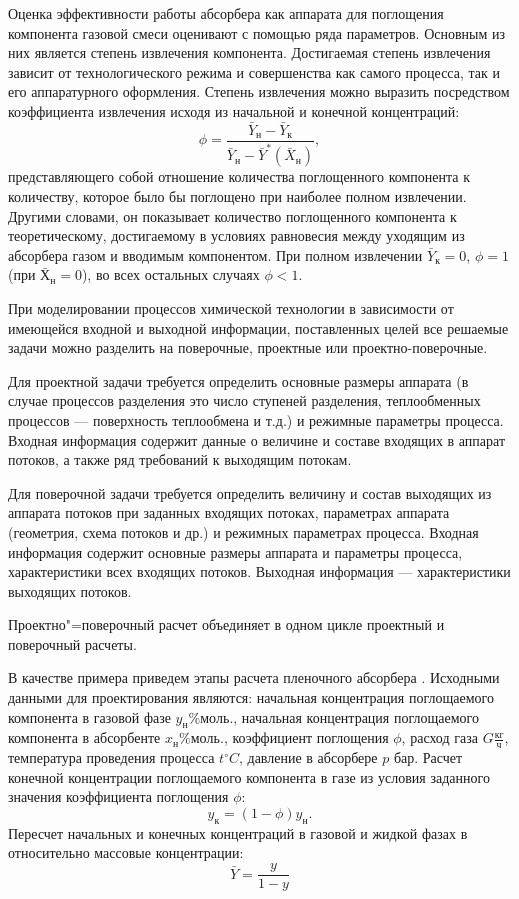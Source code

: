 Оценка эффективности работы абсорбера как аппарата для поглощения компонента газовой смеси оценивают с помощью ряда параметров. Основным из них является степень извлечения компонента. Достигаемая степень извлечения зависит от технологического режима и совершенства как самого процесса, так и его аппаратурного оформления. Степень извлечения можно выразить посредством коэффициента извлечения исходя из начальной и конечной концентраций:
\begin{equation}
	\phi =\dfrac{\bar{Y}_н - \bar{Y}_к}{\bar{Y}_н - \bar{Y}^*(\bar{X}_н)},
\end{equation}
представляющего собой отношение количества поглощенного компонента к количеству, которое было бы поглощено при наиболее полном извлечении. Другими словами, он показывает количество поглощенного компонента к теоретическому, достигаемому в условиях равновесия между уходящим из абсорбера газом и вводимым компонентом. При полном извлечении $\bar{Y}_к=0$, $\phi=1$ (при $\bar{Х}_н=0$), во всех остальных случаях $\phi<1$.
 
При моделировании процессов химической технологии в зависимости от имеющейся входной и выходной информации, поставленных целей все решаемые задачи можно разделить на поверочные, проектные или проектно-поверочные.

Для проектной задачи требуется определить основные размеры аппарата (в случае процессов разделения это число ступеней разделения, теплообменных процессов --- поверхность теплообмена и т.д.) и режимные параметры процесса. Входная информация содержит данные о величине и составе входящих в аппарат потоков, а также ряд требований к выходящим потокам. 

Для поверочной задачи требуется определить величину и состав выходящих из аппарата потоков при заданных входящих потоках, параметрах аппарата (геометрия, схема потоков и др.) и режимных параметрах процесса. Входная информация содержит основные размеры аппарата и параметры процесса, характеристики всех входящих потоков. Выходная информация --- характеристики выходящих потоков.

Проектно"=поверочный расчет объединяет в одном цикле проектный и поверочный расчеты. 

В качестве примера приведем этапы расчета пленочного абсорбера \cite{pavlov}. Исходными данными для проектирования являются: начальная концентрация поглощаемого компонента в газовой фазе $y_н \% моль.$, начальная концентрация поглощаемого компонента в абсорбенте $x_н \% моль.$, коэффициент поглощения $\phi$, расход газа $G \frac{кг}{ч}$, температура проведения процесса $t ^\circ C$, давление в абсорбере $p $ бар.
Расчет конечной концентрации поглощаемого компонента в газе из условия заданного значения коэффициента поглощения $\phi$:
\begin{equation}
	y_к = (1-\phi) y_н.
\end{equation}
Пересчет начальных и конечных концентраций в газовой и жидкой фазах в относительно массовые концентрации:
\begin{equation}
	\bar{Y	}= \dfrac{y}{1-y}
\end{equation}

